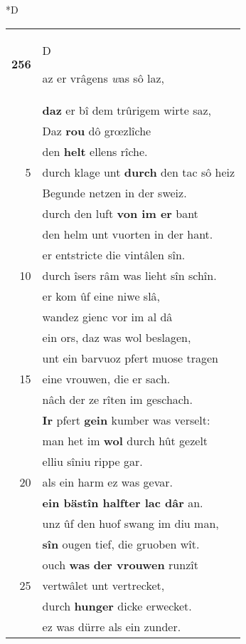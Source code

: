 \documentclass[8pt,a4paper,notitlepage]{article}
\begin{document}
\begin{table}[ht]
\begin{minipage}[t]{0.5\linewidth}
\small
\begin{center}*D
\end{center}
\begin{tabular}{rl}
\textbf{256} & \begin{large}D\end{large}az er vrâgens \textit{w}as sô laz,\\ 
 & \textbf{daz} er bî dem trûrigem wirte saz,\\ 
 & Daz \textbf{rou} dô grœzlîche\\ 
 & den \textbf{helt} ellens rîche.\\ 
5 & durch klage unt \textbf{durch} den tac sô heiz\\ 
 & Begunde netzen in der sweiz.\\ 
 & durch den luft \textbf{von im er} bant\\ 
 & den helm unt vuorten in der hant.\\ 
 & er entstricte die vintâlen sîn.\\ 
10 & durch îsers râm was lieht sîn schîn.\\ 
 & er kom ûf eine niwe slâ,\\ 
 & wandez gienc vor im al dâ\\ 
 & ein ors, daz was wol beslagen,\\ 
 & unt ein barvuoz pfert muose tragen\\ 
15 & eine vrouwen, die er sach.\\ 
 & nâch der ze rîten im geschach.\\ 
 & \textbf{Ir} pfert \textbf{gein} kumber was verselt:\\ 
 & man het im \textbf{wol} durch hût gezelt\\ 
 & elliu sîniu rippe gar.\\ 
20 & als ein harm ez was gevar.\\ 
 & \textbf{ein bästîn halfter lac dâr} an.\\ 
 & unz ûf den huof swang im diu man,\\ 
 & \textbf{sîn} ougen tief, die gruoben wît.\\ 
 & ouch \textbf{was} \textbf{der vrouwen} runzît\\ 
25 & vertwâlet unt vertrecket,\\ 
 & durch \textbf{hunger} dicke erwecket.\\ 
 & ez was dürre als ein zunder.\\ 

\end{tabular}
\end{minipage}
\end{table}
\end{document}
